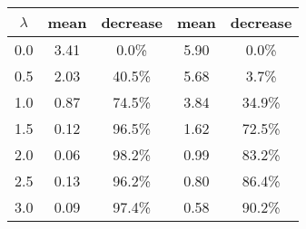 \begin{tabular}{c||c|c||c|c}
\toprule
 $\lambda$ &  mean & decrease &  mean & decrease \\
\midrule
       0.0 &  3.41 &    0.0\% &  5.90 &    0.0\% \\
       0.5 &  2.03 &   40.5\% &  5.68 &    3.7\% \\
       1.0 &  0.87 &   74.5\% &  3.84 &   34.9\% \\
       1.5 &  0.12 &   96.5\% &  1.62 &   72.5\% \\
       2.0 &  0.06 &   98.2\% &  0.99 &   83.2\% \\
       2.5 &  0.13 &   96.2\% &  0.80 &   86.4\% \\
       3.0 &  0.09 &   97.4\% &  0.58 &   90.2\% \\
\bottomrule
\end{tabular}
